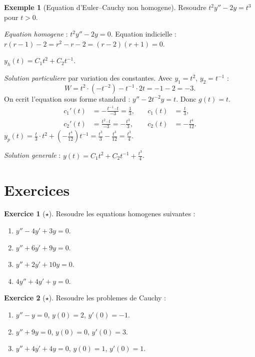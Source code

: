 \documentclass[12pt,a4paper,openany]{book}
\theoremstyle{definition}
\newtheorem{exemple}[definition]{Exemple}
\newtheorem{exercice}{Exercice}[chapter]
\theoremstyle{plain}
\theoremstyle{remark}
\begin{document}
\begin{exemple}[Equation d'Euler--Cauchy non homogene]\label{ex:euler-cauchy-nh}
Resoudre $t^2 y'' - 2y = t^3$ pour $t > 0$.

\emph{Equation homogene} : $t^2y'' - 2y = 0$. Equation indicielle : $r(r-1) - 2 = r^2 - r - 2 = (r-2)(r+1) = 0$.

$y_h(t) = C_1 t^2 + C_2 t^{-1}$.

\emph{Solution particuliere} par variation des constantes. Avec $y_1 = t^2$, $y_2 = t^{-1}$ :
\[
  W = t^2 \cdot (-t^{-2}) - t^{-1} \cdot 2t = -1 - 2 = -3.
\]
On ecrit l'equation sous forme standard : $y'' - 2t^{-2}y = t$. Donc $g(t) = t$.
\begin{align*}
  c_1'(t) &= -\frac{t^{-1} \cdot t}{-3} = \frac{1}{3}, &\quad c_1(t) &= \frac{t}{3}, \\
  c_2'(t) &= \frac{t^2 \cdot t}{-3} = -\frac{t^3}{3}, &\quad c_2(t) &= -\frac{t^4}{12}.
\end{align*}
$y_p(t) = \frac{t}{3} \cdot t^2 + \left(-\frac{t^4}{12}\right) t^{-1} = \frac{t^3}{3} - \frac{t^3}{12} = \frac{t^3}{4}$.

\emph{Solution generale} : $y(t) = C_1 t^2 + C_2 t^{-1} + \frac{t^3}{4}$.
\end{exemple}

\section{Exercices}\label{sec:exos-ch4}

\begin{exercice}[$\star$]\label{exo:edl2-homogene}
Resoudre les equations homogenes suivantes :
\begin{enumerate}[label=(\alph*)]
  \item $y'' - 4y' + 3y = 0$.
  \item $y'' + 6y' + 9y = 0$.
  \item $y'' + 2y' + 10y = 0$.
  \item $4y'' + 4y' + y = 0$.
\end{enumerate}
\end{exercice}

\begin{exercice}[$\star$]\label{exo:cauchy-lineaire}
Resoudre les problemes de Cauchy :
\begin{enumerate}[label=(\alph*)]
  \item $y'' - y = 0$, $y(0) = 2$, $y'(0) = -1$.
  \item $y'' + 9y = 0$, $y(0) = 0$, $y'(0) = 3$.
  \item $y'' + 4y' + 4y = 0$, $y(0) = 1$, $y'(0) = 1$.
\end{enumerate}
\end{exercice}
\end{document}
